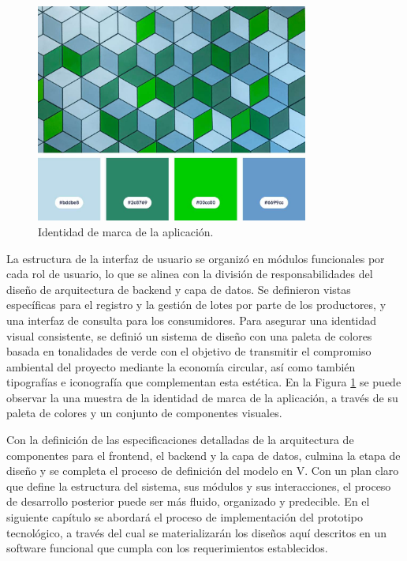 \begin{figure}[!htb]
\centering
\includegraphics[width=0.8\textwidth]{Figures/frontend-palette.jpg}
\caption{Identidad de marca de la aplicación.}
\label{fig:frontend-brand}
\end{figure}

La estructura de la interfaz de usuario se organizó en módulos funcionales por cada rol de usuario, lo que se alinea con la división de responsabilidades del diseño de arquitectura de backend y capa de datos. Se definieron vistas específicas para el registro y la gestión de lotes por parte de los productores, y una interfaz de consulta para los consumidores. Para asegurar una identidad visual consistente, se definió un sistema de diseño con una paleta de colores basada en tonalidades de verde con el objetivo de transmitir el compromiso ambiental del proyecto mediante la economía circular, así como también tipografías e iconografía que complementan esta estética. En la Figura \ref{fig:frontend-brand} se puede observar la una muestra de la identidad de marca de la aplicación, a través de su paleta de colores y un conjunto de componentes visuales.

Con la definición de las especificaciones detalladas de la arquitectura de componentes para el frontend, el backend y la capa de datos, culmina la etapa de diseño y se completa el proceso de definición del modelo en V. Con un plan claro que define la estructura del sistema, sus módulos y sus interacciones, el proceso de desarrollo posterior puede ser más fluido, organizado y predecible. En el siguiente capítulo se abordará el proceso de implementación del prototipo tecnológico, a través del cual se materializarán los diseños aquí descritos en un software funcional que cumpla con los requerimientos establecidos.